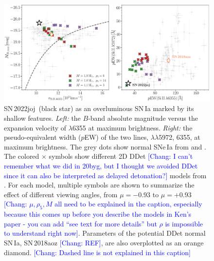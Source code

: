 \documentclass[twocolumn]{aastex631}
\newcommand{\sn}{SN\,2022joj}
\newcommand{\chang}[1]{\textcolor{blue}{[Chang: #1]}}
\begin{document}
\begin{CJK*}{UTF8}{gbsn}
\begin{figure}
    \centering
    \includegraphics[width=\linewidth]{phase_space.pdf}
    \caption{\sn\ (black star) as an overluminous SN\,Ia marked by its shallow  features. \textit{Left:} the $B$-band absolute magnitude versus the expansion velocity of  $\lambda$6355 at maximum brightness. \textit{Right:} the pseudo-equivalent width ($p$EW) of the two  lines,  $\lambda\lambda$5972, 6355, at maximum brightness. The grey dots show normal SNe\,Ia from \citet{Zheng_2018} and \citet{Burrow_2020}. The colored $\times$ symbols show different 2D DDet \chang{I can't remember what we did in 20byg, but I thought we avoided DDet since it can also be interpreted as delayed detonation?} models from \citet{Shen_2D_2021}. For each model, multiple symbols are shown to summarize the effect of different viewing angles, from $\mu = -0.93$ to $\mu=+0.93$ \chang{$\mu, \rho_5, M$ all need to be explained in the caption, especially because this comes up before you describe the models in Ken's paper - you can add ``see text for more details'' but $\rho$ is impossible to understand right now}. Parameters of the potential DDet normal SN\,Ia, SN\,2018aoz \chang{REF}, are also overplotted as an orange diamond. \chang{Dashed line is not explained in this caption}}
    \label{fig:phase_space}
\end{figure}


\end{CJK*}
\end{document}
